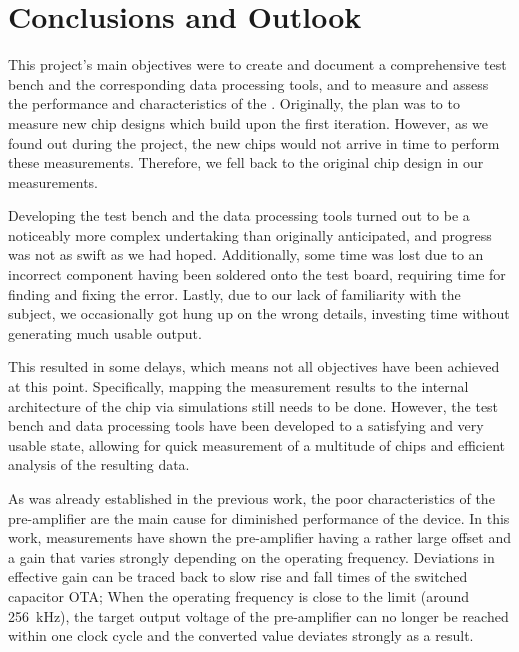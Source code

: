 \chapter{Conclusions and Outlook}
\label{chap:conclusions}

This project's  main objectives  were to create  and document  a comprehensive
test bench  and the corresponding  data processing  tools, and to  measure and
assess  the performance  and  characteristics of  the  \sdm.  Originally,  the
plan  was  to  to  measure  new  chip  designs  which  build  upon  the  first
iteration. However, as  we found out during  the project, the new  chips would
not arrive in  time to perform these measurements. Therefore, we  fell back to
the original chip design in our measurements.

Developing the  test bench and  the data processing tools  turned out to  be a
noticeably more complex undertaking  than originally anticipated, and progress
was not as swift as we had hoped.   Additionally, some time was lost due to an
incorrect component having  been soldered onto the test  board, requiring time
for finding and fixing the error. Lastly,  due to our lack of familiarity with
the subject, we occasionally got hung  up on the wrong details, investing time
without generating much usable output.

This  resulted in  some  delays,  which means  not  all  objectives have  been
achieved  at  this point. Specifically,  mapping  the  measurement results  to
the  internal architecture  of  the chip  via simulations  still  needs to  be
done.  However, the  test bench and data processing tools  have been developed
to a  satisfying and very  usable state, allowing  for quick measurement  of a
multitude of chips and efficient analysis of the resulting data.

As  was already  established in  the previous  work\cite{ref:gloor}, the  poor
characteristics  of  the  pre-amplifier  are the  main  cause  for  diminished
performance  of  the  device.   In  this work,  measurements  have  shown  the
pre-amplifier having  a rather large  offset and  a gain that  varies strongly
depending  on the  operating frequency. Deviations  in effective  gain can  be
traced back to  slow rise and fall  times of the switched  capacitor OTA; When
the operating frequency is close  to the limit (around \SI{256}{\kilo\hertz}),
the target output voltage of the pre-amplifier can no longer be reached within
one clock cycle and the converted value deviates strongly as a result.

